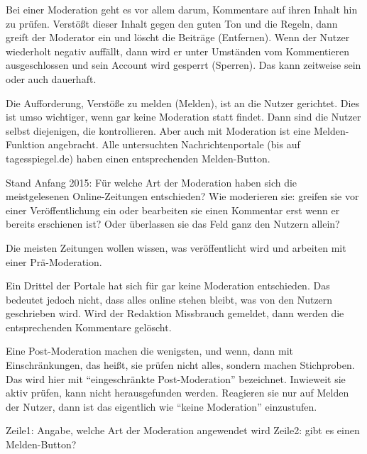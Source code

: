 



Bei einer Moderation geht es vor allem darum, Kommentare auf ihren Inhalt hin zu prüfen. Verstößt dieser Inhalt gegen den guten Ton und die Regeln, dann greift der Moderator ein und löscht die Beiträge (Entfernen). Wenn der Nutzer wiederholt negativ auffällt, dann wird er unter Umständen vom Kommentieren ausgeschlossen und sein Account wird gesperrt (Sperren). Das kann zeitweise sein oder auch dauerhaft.   

Die Aufforderung, Verstöße zu melden (Melden), ist an die Nutzer gerichtet. Dies ist umso wichtiger, wenn gar keine Moderation statt findet. Dann sind die Nutzer selbst diejenigen, die kontrollieren. Aber auch mit Moderation ist eine Melden-Funktion angebracht. Alle  untersuchten Nachrichtenportale (bis auf tagesspiegel.de) haben einen entsprechenden Melden-Button.

Stand Anfang 2015: Für welche Art der Moderation haben sich die meistgelesenen Online-Zeitungen entschieden? Wie moderieren sie: greifen sie vor einer Veröffentlichung ein oder bearbeiten sie einen Kommentar erst wenn er bereits erschienen ist? Oder überlassen sie das Feld ganz den Nutzern allein? 

Die meisten Zeitungen wollen wissen, was veröffentlicht wird und arbeiten mit einer Prä-Moderation. 

Ein Drittel der Portale hat sich für gar keine Moderation entschieden. Das bedeutet jedoch nicht, dass alles online stehen bleibt, was von den Nutzern geschrieben wird. Wird der Redaktion Missbrauch gemeldet, dann werden die entsprechenden Kommentare gelöscht. 

Eine Post-Moderation machen die wenigsten, und wenn, dann mit Einschränkungen, das heißt, sie prüfen nicht alles, sondern machen Stichproben. Das wird hier mit ``eingeschränkte Post-Moderation'' bezeichnet. Inwieweit sie aktiv prüfen, kann nicht herausgefunden werden. Reagieren sie nur auf Melden der Nutzer, dann 
ist das eigentlich wie ``keine Moderation'' einzustufen.

Zeile1: Angabe, welche Art der Moderation angewendet wird
Zeile2: gibt es einen Melden-Button?



